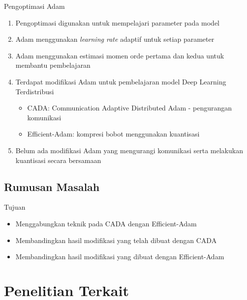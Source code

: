 \documentclass[aspectratio=169]{beamer}
\begin{document}
\begin{frame}{Pengoptimasi Adam}
  \begin{enumerate}
    \item Pengoptimasi digunakan untuk mempelajari parameter pada model
    \item Adam \parencite{ADAMKingma} menggunakan \textit{learning rate} adaptif untuk setiap parameter
    \item Adam menggunakan estimasi momen orde pertama dan kedua untuk membantu pembelajaran
    \item Terdapat modifikasi Adam untuk pembelajaran model Deep Learning Terdistribusi
          \begin{itemize}
            \item CADA: Communication Adaptive Distributed Adam - pengurangan komunikasi \parencite{Chen2021CADA}
            \item Efficient-Adam: kompresi bobot menggunakan kuantisasi \parencite{Chen2022Efficient}
          \end{itemize}
    \item Belum ada modifikasi Adam yang mengurangi komunikasi serta melakukan kuantisasi secara bersamaan
  \end{enumerate}
\end{frame}

\subsection{Rumusan Masalah}
\begin{frame}{Tujuan}
  \begin{itemize}
    \item Menggabungkan teknik pada CADA dengan Efficient-Adam
    \item Membandingkan hasil modifikasi yang telah dibuat dengan CADA
    \item Membandingkan hasil modifikasi yang dibuat dengan Efficient-Adam
  \end{itemize}
\end{frame}

\section{Penelitian Terkait}
\end{document}
